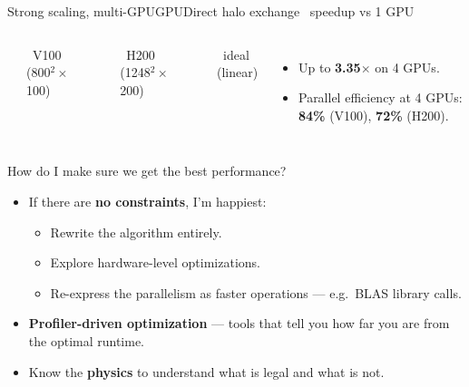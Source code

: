 \documentclass[aspectratio=169]{beamer}
\begin{document}
\begin{frame}{Strong scaling, multi-GPU}{GPUDirect halo exchange \textperiodcentered\ speedup vs 1 GPU}
  \begin{columns}[c,onlytextwidth]
      \centering
      \footnotesize
      \textcolor{cookieAccent}{\rule{1.4em}{2pt}}~V100 (800$^2\times$100)\\[.3em]
      \textcolor{cookieWarm}{\rule{1.4em}{2pt}}~H200 (1248$^2\times$200)\\[.3em]
      \textcolor{cookieLine}{\rule{1.4em}{2pt}}~ideal (linear)
      \vspace{.6em}
      \begin{itemize}
        \item Up to \textbf{3.35$\times$} on 4 GPUs.
        \item Parallel efficiency at 4 GPUs: \textbf{84\%} (V100), \textbf{72\%} (H200).
      \end{itemize}
  \end{columns}
\end{frame}

\begin{frame}{How do I make sure we get the best performance?}
  \begin{itemize}
    \item If there are \textbf{no constraints}, I'm happiest:
      \begin{itemize}
        \item Rewrite the algorithm entirely.
        \item Explore hardware-level optimizations.
        \item Re-express the parallelism as faster operations --- e.g.\ BLAS library calls.
      \end{itemize}
    \item \textbf{Profiler-driven optimization} --- tools that tell you how far you are from the optimal runtime.
    \item Know the \textbf{physics} to understand what is legal and what is not.
  \end{itemize}
\end{frame}
\end{document}
